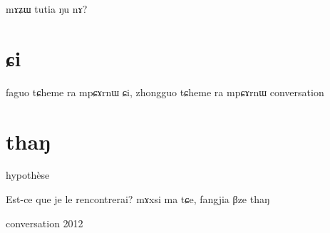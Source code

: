 \documentclass[oldfontcommands,oneside,a4paper,11pt]{memoir}
\newcommand{\wav}[1]{}%
\begin{document}
mɤʑɯ tutia ŋu nɤ?


\section{ɕi}
faguo tɕheme ra mpɕɤrnɯ ɕi, zhongguo tɕheme ra mpɕɤrnɯ
conversation

\section{thaŋ}
hypothèse

Est-ce que je le rencontrerai?
mɤxsi ma tɕe, fangjia βze thaŋ
\wav{8_BzethaN}
conversation 2012
\tableofcontents


\end{document}
